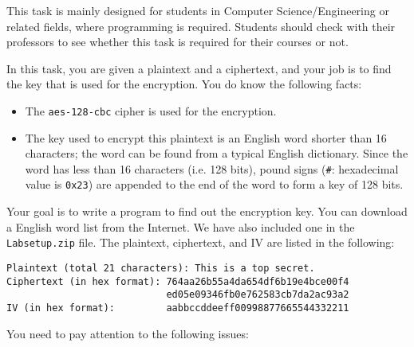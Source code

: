 This task is mainly designed for students in Computer Science/Engineering
or related fields, where programming is required. Students should
check with their professors to see whether this task is required
for their courses or not.


In this task, you are given a plaintext and a ciphertext, and
your job is to find the key that is used for the encryption.
You do know the following facts:

\begin{itemize}
\item The {\tt aes-128-cbc} cipher is used for the encryption.
\item The key used to encrypt this plaintext is an English
word shorter than 16 characters; the word can be found from a typical
English dictionary.  Since the word has less than 16 characters (i.e. 128
bits), pound signs (\texttt{\#}: hexadecimal value is \texttt{0x23})
are appended to the end of the word to form a key of 128 bits.
\end{itemize}


Your goal is to write a program to
find out the encryption key. You can download a English word list
from the Internet.  We have also included one in
the \texttt{Labsetup.zip} file.
The plaintext, ciphertext, and IV are listed in the following:


\begin{lstlisting}
Plaintext (total 21 characters): This is a top secret.
Ciphertext (in hex format): 764aa26b55a4da654df6b19e4bce00f4
                            ed05e09346fb0e762583cb7da2ac93a2
IV (in hex format):         aabbccddeeff00998877665544332211
\end{lstlisting}



You need to pay attention to the following issues:

